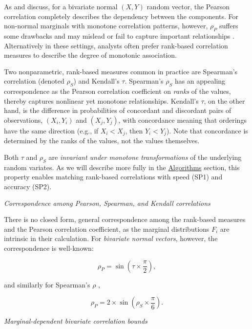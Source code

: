 \documentclass[
]{jss}
\begin{document}
As \citet{MB13} and \citet{MK01} discuss, for a bivariate normal \((X,Y)\) random vector, the Pearson correlation completely describes the dependency between the components. For non-normal marginals with monotone correlation patterns, however, \(\rho_P\) suffers some drawbacks and may mislead or fail to capture important relationships \citep{MK01}. Alternatively in these settings, analysts often prefer rank-based correlation measures to describe the degree of monotonic association.

Two nonparametric, rank-based measures common in practice are Spearman's correlation (denoted \(\rho_S\)) and Kendall's \(\tau\). Spearman's \(\rho_S\) has an appealing correspondence as the Pearson correlation coefficient on \emph{ranks} of the values, thereby captures nonlinear yet monotone relationships. Kendall's \(\tau\), on the other hand, is the difference in probabilities of concordant and discordant pairs of observations, \((X_i, Y_i)\) and \((X_j, Y_j)\), with concordance meaning that orderings have the same direction (e.g., if \(X_i < X_j\), then \(Y_i < Y_j\)). Note that concordance is determined by the ranks of the values, not the values themselves.

Both \(\tau\) and \(\rho_S\) are \emph{invariant under monotone transformations} of the underlying random variates. As we will describe more fully in the \protect\hyperlink{algorithms}{Algorithms} section, this property enables matching rank-based correlations with speed (SP1) and accuracy (SP2).

\emph{Correspondence among Pearson, Spearman, and Kendall correlations}

There is no closed form, general correspondence among the rank-based measures and the Pearson correlation coefficient, as the marginal distributions \(F_i\) are intrinsic in their calculation. For \emph{bivariate normal vectors}, however, the correspondence is well-known:

\begin{equation}
\label{eq:convertKendall}
\rho_{P} = \sin \left( \tau \times \frac{\pi}{2} \right), 
\end{equation}

\noindent and similarly for Spearman's \(\rho\) \citep{K58},

\begin{equation}
\label{eq:convertSpearman}
\rho_P = 2 \times \sin \left( \rho_S \times \frac{\pi}{6} \right).
\end{equation}

\emph{Marginal-dependent bivariate correlation bounds}
\end{document}
